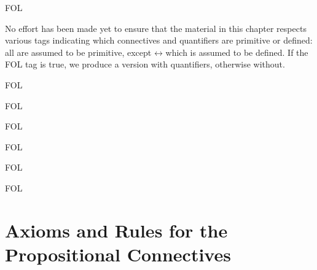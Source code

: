 \documentclass[10pt,a4paper]{article}
\theoremstyle{plain}
\theoremstyle{definition}
\theoremstyle{remark}
\newenvironment{editorial}{}{}
\newcommand*{\olfileid}[3]{}
\newcommand*{\olsection}[1]{\section*{#1}}
\newcommand*{\olchapter}[3]{}
\newcommand*{\olimport}[1]{}
\providecommand{\iftag}[1]{#1}
\providecommand{\liff}{\mathbin{\leftrightarrow}}
\begin{document}



\iftag{FOL}
      {\olchapter{fol}{axd}{Axiomatic \usetoken{P}{derivation}}}
      {\olchapter{pl}{axd}{Axiomatic \usetoken{P}{derivation}}}

\begin{editorial}
  No effort has been made yet to ensure that the material in this
  chapter respects various tags indicating which connectives and
  quantifiers are primitive or defined: all are assumed to be
  primitive, except $\liff$ which is assumed to be defined. If the FOL
  tag is true, we produce a version with quantifiers, otherwise
  without.
\end{editorial}

\olimport{rules-and-proofs}

\olimport{axioms-rules-propositional}

\iftag{FOL}{%
  \olimport{axioms-rules-quantifiers}
}{}

\olimport{proving-things}

\iftag{FOL}{%
  \olimport{proving-things-quant}
}{}

\olimport{proof-theoretic-notions}

\olimport{deduction-theorem}

\iftag{FOL}{%
  \olimport{deduction-theorem-quantifiers}
}{}

\olimport{provability-consistency}

\olimport{provability-propositional}

\iftag{FOL}{%
  \olimport{provability-quantifiers}
}{}

\olimport{soundness}

\iftag{FOL}{
  \olimport{identity}
}{}

\OLEndChapterHook





\iftag{FOL}
      {\olfileid{fol}{axd}{prp}}
      {\olfileid{pl}{axd}{prp}}

\olsection{Axioms and Rules for the Propositional Connectives}
\end{document}
